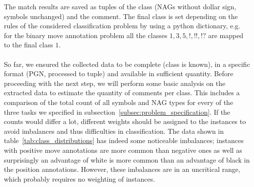 \documentclass[article,type=msc,colorback,accentcolor=tud7b]{tudthesis}
\begin{document}
    The match results are saved as tuples of the class (NAGs without dollar sign, symbols unchanged) and the comment. The final class is set depending on the rules of the considered classification problem by using a python dictionary, e.g. for the binary move annotation problem all the classes $1, 3, 5, !, !!, !?$ are mapped to the final class $1$. \\\\
    So far, we ensured the collected data to be complete (class is known), in a specific format (PGN, processed to tuple) and available in sufficient quantity. Before proceeding with the next step, we will perform some basic analysis on the extracted data to estimate the quantity of comments per class. This includes a comparison of the total count of all symbols and NAG types for every of the three tasks we specified in subsection~\ref{subsec:problem_specification}. If the counts would differ a lot, different weights should be assigned to the instances to avoid imbalances and thus difficulties in classification. The data shown in table~\ref{tab:class_distributions} has indeed some noticeable imbalances; instances with positive move annotations are more common than negative ones as well as surprisingly an advantage of white is more common than an advantage of black in the position annotations. However, these imbalances are in an uncritical range, which probably requires no weighting of instances.
\end{document}
